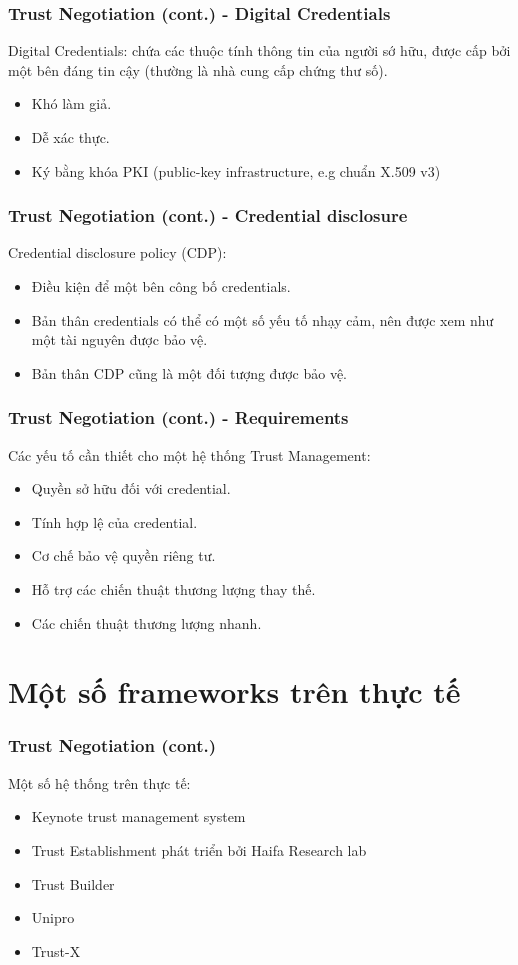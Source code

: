 \documentclass[11pt]{beamer}
\begin{document}
\begin{frame}
\frametitle{Trust Negotiation (cont.) - Digital Credentials}
Digital Credentials: chứa các thuộc tính thông tin của người sớ hữu, được cấp bởi một bên đáng tin cậy (thường là nhà cung cấp chứng thư số).
\begin{itemize}
\item Khó làm giả.
\item Dễ xác thực.
\item Ký bằng khóa PKI (public-key infrastructure, e.g chuẩn X.509 v3)
\end{itemize}
\end{frame}

\begin{frame}
\frametitle{Trust Negotiation (cont.) - Credential disclosure}
Credential disclosure policy (CDP):
\begin{itemize}
\item Điều kiện để một bên công bố credentials.
\item Bản thân credentials có thể có một số yếu tố nhạy cảm, nên được xem như một tài nguyên được bảo vệ.
\item Bản thân CDP cũng là một đối tượng được bảo vệ.
\end{itemize}
\end{frame}

\begin{frame}
\frametitle{Trust Negotiation (cont.) - Requirements}
Các yếu tố cần thiết cho một hệ thống Trust Management:
\begin{itemize}
\item Quyền sở hữu đối với credential.
\item Tính hợp lệ của credential.
\item Cơ chế bảo vệ quyền riêng tư.
\item Hỗ trợ các chiến thuật thương lượng thay thế.
\item Các chiến thuật thương lượng nhanh.
\end{itemize}
\end{frame}

\section{Một số frameworks trên thực tế}
\begin{frame}
\frametitle{Trust Negotiation (cont.)}
Một số hệ thống trên thực tế:
\begin{itemize}
\item Keynote trust management system
\item Trust Establishment phát triển bởi Haifa Research lab
\item Trust Builder
\item Unipro
\item Trust-X
\end{itemize}
\end{frame}
\end{document}
